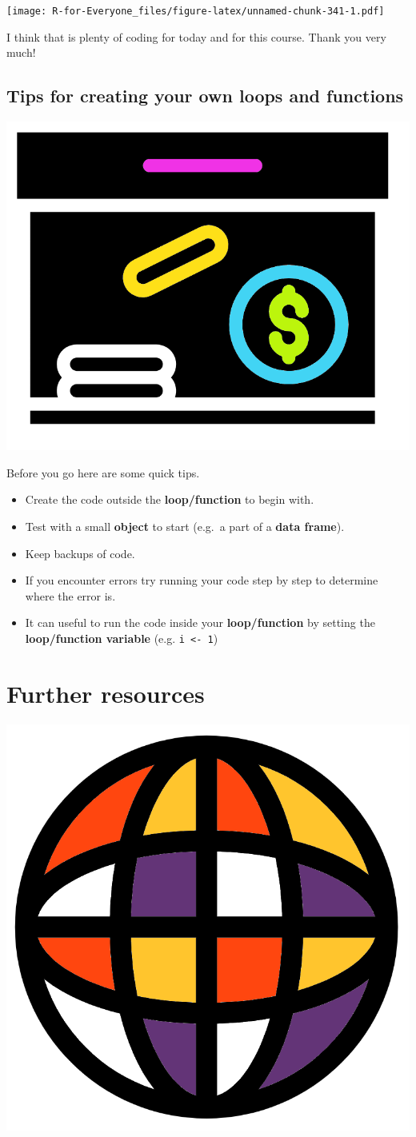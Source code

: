 \documentclass[]{book}
\providecommand{\tightlist}{%
  \setlength{\itemsep}{0pt}\setlength{\parskip}{0pt}}
\begin{document}
\texttt{[image: R-for-Everyone\_files/figure-latex/unnamed-chunk-341-1.pdf]}

I think that is plenty of coding for today and for this course. Thank
you very much!

\section{Tips for creating your own loops and
functions}\label{tips-for-creating-your-own-loops-and-functions}

\begin{center}\includegraphics[width=0.2\linewidth]{figures/tip_box} \end{center}

Before you go here are some quick tips.

\begin{itemize}
\tightlist
\item
  Create the code outside the \textbf{loop/function} to begin with.
\item
  Test with a small \textbf{object} to start (e.g.~a part of a
  \textbf{data frame}).
\item
  Keep backups of code.
\item
  If you encounter errors try running your code step by step to
  determine where the error is.
\item
  It can useful to run the code inside your \textbf{loop/function} by
  setting the \textbf{loop/function variable} (e.g.
  \texttt{i\ \textless{}-\ 1})
\end{itemize}

\chapter{Further resources}\label{further-resources}

\begin{center}\includegraphics[width=0.2\linewidth]{figures/internet} \end{center}
\end{document}
